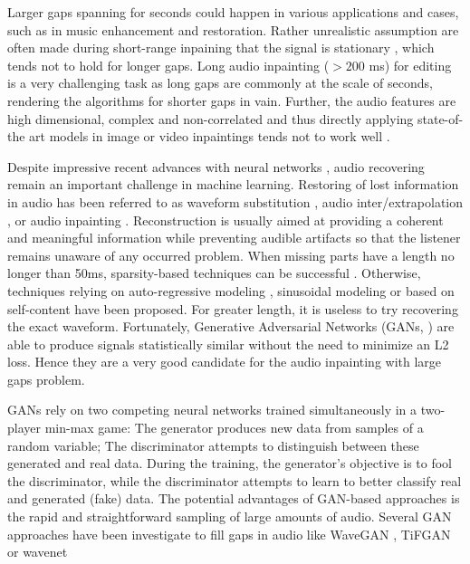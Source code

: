 \documentclass{article} %
\begin{document}
Larger gaps spanning for seconds could happen in various applications and cases, such as in music enhancement and restoration. Rather unrealistic assumption are often made during short-range inpaining that the signal is stationary \cite{perraudin2018}, which tends not to hold for longer gaps. Long audio inpainting ($>200$ ms) for editing is a very challenging task as long gaps are commonly at the scale of seconds, rendering the algorithms for shorter gaps in vain. Further, the audio features are high dimensional, complex and non-correlated and thus directly applying state-of-the art models in image or video inpaintings tends not to work well \cite{chang2019}.

Despite impressive recent advances with neural networks \cite{van2016wavenet, donahue2018wavegan}, audio recovering remain an important challenge in machine learning. Restoring of lost information in audio has been referred to as waveform substitution \cite{goodman1986}, audio inter/extrapolation \cite{kauppinen2001, etter1996}, or audio inpainting \cite{adler2012}. Reconstruction is usually aimed at providing a coherent and meaningful information while preventing audible artifacts so that the listener remains unaware of any occurred problem. When missing parts have a length no longer than 50ms, sparsity-based techniques can be successful \cite{adler2012, siedenburg2013}. Otherwise, techniques relying on auto-regressive modeling \cite{etter1996}, sinusoidal modeling \cite{lagrange2005, lukin2008} or based on self-content \cite{bahat2015} have been proposed. For greater length, it is useless to try recovering the exact waveform. Fortunately, Generative Adversarial Networks (GANs, \cite{goodfellow2014}) are able to produce signals statistically similar without the need to minimize an L2 loss. Hence they are a very good candidate for the audio inpainting with large gaps problem.

GANs rely on two competing neural networks trained simultaneously in a two-player min-max game: The generator produces new data from samples of a random variable; The discriminator attempts to distinguish between these generated and real data. During the training, the generator's objective is to fool the discriminator, while the discriminator attempts to learn to better classify real and generated (fake) data. The potential advantages of GAN-based approaches is the rapid and straightforward sampling of large amounts of audio. Several GAN approaches have been investigate to fill gaps in audio like WaveGAN \cite{donahue2018wavegan}, TiFGAN \cite{marafioti2019adversarial} or wavenet \cite{van2016wavenet}
\end{document}
